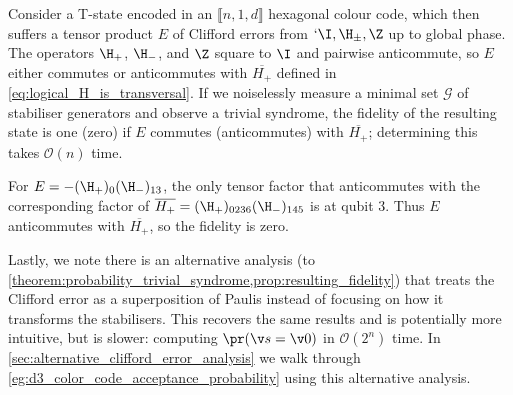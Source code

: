\begin{prop}\label{prop:resulting_fidelity}
Consider a T-state encoded in an $\llbracket n, 1, d \rrbracket$
hexagonal colour code,
which then suffers a tensor product $E$ of Clifford errors from $`{\I, \H_\pm, \Z}$
up to global phase.
The operators $\H_+$, $\H_-$, and $\Z$
square to $\I$ and pairwise anticommute,
so $E$ either commutes or anticommutes with
$\overline{H_+}$ defined in \cref{eq:logical_H_is_transversal}.
If we noiselessly measure a minimal set $\mathcal G$ of stabiliser generators
and observe a trivial syndrome,
the fidelity of the resulting state is
one (zero) if $E$ commutes (anticommutes) with
$\overline{H_+}$;
determining this takes $\mathcal O(n)$ time.
\end{prop}

\begin{eg*}
For $E =-(\H_+)_0(\H_-)_{1 3}$,
the only tensor factor that anticommutes with the corresponding
factor of $\overline{H_+}=(\H_+)_{0 2 3 6}(\H_-)_{1 4 5}$
is at qubit 3.
Thus $E$ anticommutes with $\overline{H_+}$, so the fidelity is zero.
\end{eg*}

Lastly,
we note there is an alternative analysis
(to \cref{theorem:probability_trivial_syndrome,prop:resulting_fidelity})
that treats the Clifford error as a superposition of Paulis
instead of focusing on how it transforms the stabilisers.
This recovers the same results
and is potentially more intuitive,
but is slower:
computing $\pr(\v s =\v 0)$ in $\mathcal O(2^n)$ time.
In \cref{sec:alternative_clifford_error_analysis}
we walk through \cref{eg:d3_color_code_acceptance_probability}
using this alternative analysis.